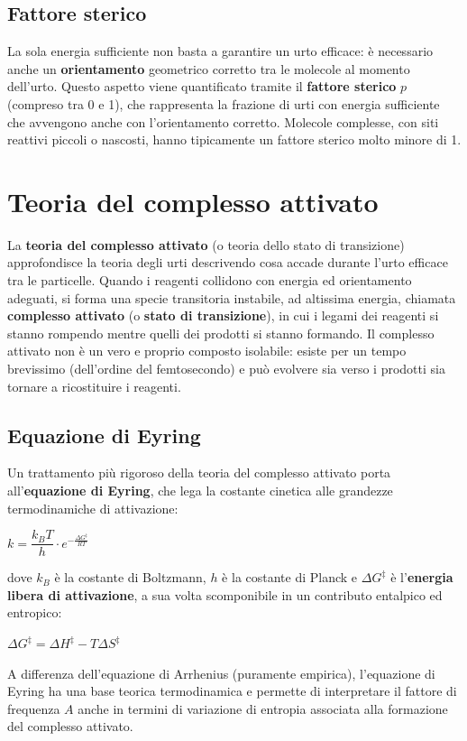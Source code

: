 \documentclass[11pt, a4paper, openright]{book}
\begin{document}
\subsection{Fattore sterico}
La sola energia sufficiente non basta a garantire un urto efficace: è necessario anche un \textbf{orientamento} geometrico corretto tra le molecole al momento dell'urto. Questo aspetto viene quantificato tramite il \textbf{fattore sterico} $p$ (compreso tra 0 e 1), che rappresenta la frazione di urti con energia sufficiente che avvengono anche con l'orientamento corretto. Molecole complesse, con siti reattivi piccoli o nascosti, hanno tipicamente un fattore sterico molto minore di 1.
\section{Teoria del complesso attivato}
La \textbf{teoria del complesso attivato} (o teoria dello stato di transizione) approfondisce la teoria degli urti descrivendo cosa accade durante l'urto efficace tra le particelle.
Quando i reagenti collidono con energia ed orientamento adeguati, si forma una specie transitoria instabile, ad altissima energia, chiamata \textbf{complesso attivato} (o \textbf{stato di transizione}), in cui i legami dei reagenti si stanno rompendo mentre quelli dei prodotti si stanno formando.
Il complesso attivato non è un vero e proprio composto isolabile: esiste per un tempo brevissimo (dell'ordine del femtosecondo) e può evolvere sia verso i prodotti sia tornare a ricostituire i reagenti.
\subsection{Equazione di Eyring}
Un trattamento più rigoroso della teoria del complesso attivato porta all'\textbf{equazione di Eyring}, che lega la costante cinetica alle grandezze termodinamiche di attivazione:
\begin{center}
    $ k = \dfrac{k_B T}{h} \cdot e^{-\frac{\Delta G^{\ddagger}}{RT}}$
\end{center}
dove $k_B$ è la costante di Boltzmann, $h$ è la costante di Planck e $\Delta G^{\ddagger}$ è l'\textbf{energia libera di attivazione}, a sua volta scomponibile in un contributo entalpico ed entropico:
\begin{center}
    $ \Delta G^{\ddagger} = \Delta H^{\ddagger} - T\Delta S^{\ddagger}$
\end{center}
A differenza dell'equazione di Arrhenius (puramente empirica), l'equazione di Eyring ha una base teorica termodinamica e permette di interpretare il fattore di frequenza $A$ anche in termini di variazione di entropia associata alla formazione del complesso attivato.
\end{document}
